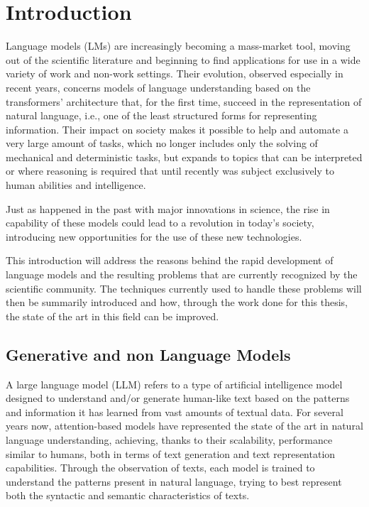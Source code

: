 


\chapter{Introduction}
\hspace{0,5cm}

Language models (LMs) are increasingly becoming a mass-market tool, moving out of the scientific literature and beginning to find applications for use in a wide variety of work and non-work settings. Their evolution, observed especially in recent years, concerns models of language understanding based on the transformers' architecture that, for the first time, succeed in the representation of natural language, i.e., one of the least structured forms for representing information. Their impact on society makes it possible to help and automate a very large amount of tasks, which no longer includes only the solving of mechanical and deterministic tasks, but expands to topics that can be interpreted or where reasoning is required that until recently was subject exclusively to human abilities and intelligence.

Just as happened in the past with major innovations in science, the rise in capability of these models could lead to a revolution in today's society, introducing new opportunities for the use of these new technologies.

This introduction will address the reasons behind the rapid development of language models and the resulting problems that are currently recognized by the scientific community. The techniques currently used to handle these problems will then be summarily introduced and how, through the work done for this thesis, the state of the art in this field can be improved.


\section{Generative and non Language Models}

A large language model (LLM) refers to a type of artificial intelligence model designed to understand and/or generate human-like text based on the patterns and information it has learned from vast amounts of textual data. For several years now, attention-based models have represented the state of the art in natural language understanding, achieving, thanks to their scalability, performance similar to humans, both in terms of text generation and text representation capabilities. Through the observation of texts, each model is trained to understand the patterns present in natural language, trying to best represent both the syntactic and semantic characteristics of texts.

